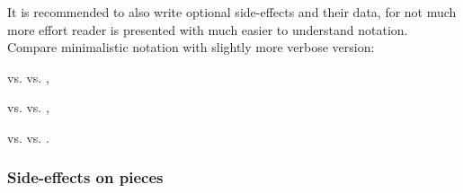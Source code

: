 It is recommended to also write optional side-effects and their data, for not much
more effort reader is presented with much easier to understand notation. Compare
minimalistic notation with slightly more verbose version:

\noindent
{} vs.\newline
{} vs.\newline
{},

\noindent
{} vs.\newline
{} vs.\newline
{},

\noindent
{} vs.\newline
{} vs.\newline
{}.


\subsubsection*{Side-effects on pieces}
\label{sec:Appendix/Summary/Side-effects/Side-effects on pieces}

